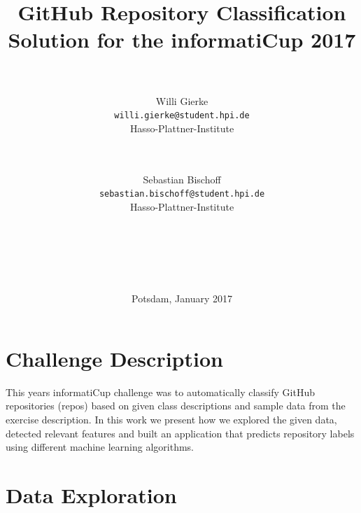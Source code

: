 \documentclass[%
a4paper,
DIV12,
2.5headlines,
bigheadings,
titlepage,
openbib,
]{scrartcl}
\begin{document}
\providecommand{\tightlist}{%
  \setlength{\itemsep}{0pt}\setlength{\parskip}{0pt}}

\DeclareRobustCommand{\desiredTitle}{
  GitHub Repository Classification\\\normalsize{Solution for the informatiCup 2017}
}

\DeclareRobustCommand{\desiredAuthor}{
  \\\\Willi Gierke\\\texttt{willi.gierke@student.hpi.de}\\Hasso-Plattner-Institute \and \\\\Sebastian Bischoff\\\texttt{sebastian.bischoff@student.hpi.de}\\Hasso-Plattner-Institute\\\\\\\\\\\\
}

\begin{titlepage}
\begin{center}
   \title{\desiredTitle}
   \author{\desiredAuthor}
   \date{Potsdam, January 2017}
   \maketitle
\end{center}
\end{titlepage}

\listoftodos
\pagebreak

\tableofcontents
\pagebreak

\section{Challenge Description}\label{challenge-description}

This years informatiCup challenge was to automatically classify GitHub repositories (repos) based on given class descriptions and sample data from the exercise description.
In this work we present how we explored the given data, detected relevant features and built an application that predicts repository labels using different machine learning algorithms.

\section{Data Exploration}\label{data-exploration}
\end{document}
